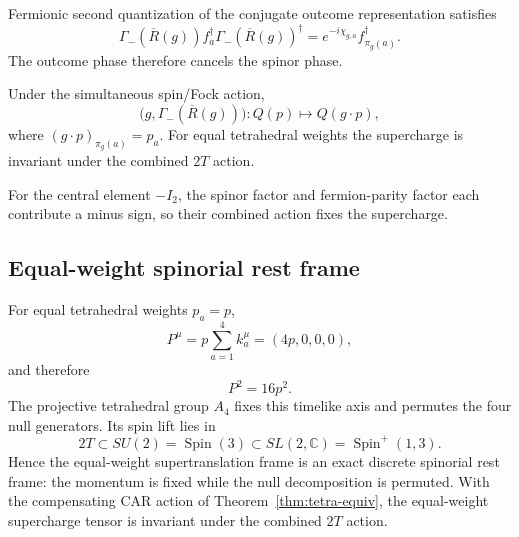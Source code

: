 Fermionic second quantization of the conjugate outcome representation satisfies
\[
\Gamma_-(\overline R(g))
f_a^\dagger
\Gamma_-(\overline R(g))^\dagger
=
e^{-i\chi_{g,a}}
f_{\pi_g(a)}^\dagger.
\]
The outcome phase therefore cancels the spinor phase.

\begin{theorem}\label{thm:tetra-equiv}
Under the simultaneous spin/Fock action,
\[
\boxed{
\bigl(g,\Gamma_-(\overline R(g))\bigr):
Q(p)\longmapsto Q(g\cdot p),
}
\]
where $(g\cdot p)_{\pi_g(a)}=p_a$. For equal tetrahedral weights the supercharge is invariant under the combined $2T$ action.

For the central element $-I_2$, the spinor factor and fermion-parity factor each contribute a minus sign, so their combined action fixes the supercharge.
\end{theorem}

\subsection{Equal-weight spinorial rest frame}

For equal tetrahedral weights $p_a=p$,
\[
P^\mu
=
p\sum_{a=1}^4 k_a^\mu
=
(4p,0,0,0),
\]
and therefore
\[
\boxed{P^2=16p^2.}
\]
The projective tetrahedral group $A_4$ fixes this timelike axis and permutes the four null generators. Its spin lift lies in
\[
2T\subset SU(2)=\operatorname{Spin}(3)
\subset
SL(2,\mathbb C)=\operatorname{Spin}^+(1,3).
\]
Hence the equal-weight supertranslation frame is an exact discrete spinorial rest frame: the momentum is fixed while the null decomposition is permuted. With the compensating CAR action of Theorem~\ref{thm:tetra-equiv}, the equal-weight supercharge tensor is invariant under the combined $2T$ action.
